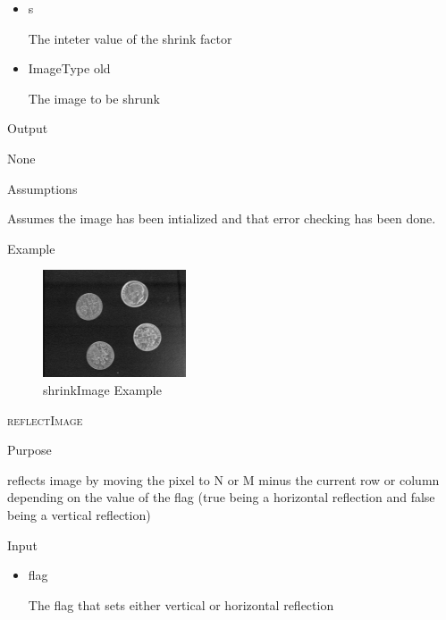 \documentclass[pdftex, 11pt]{article}
\begin{document}
\begin{description}
\begin{description}
				\begin{itemize}

					\item{s}

						The inteter value of the shrink factor

					\item{ImageType old}

						The image to be shrunk

				\end{itemize}

			\item{Output}

				None

			\item{Assumptions}

				Assumes the image has been intialized and that error
				checking has been done.

			\item{Example}

				\begin{figure}[h]
					\centering
					\caption{shrinkImage Example}
				\includegraphics{images/outshrink.png}
			\end{figure}

		\end{description}


	\item{\textsc{reflectImage}}
		\begin{description}
			\item{Purpose}

				reflects image by moving the pixel to N or M
				minus the current row or column
				depending on the value of the flag
				(true being a horizontal reflection and
				false being a vertical reflection)

			\item{Input}

				\begin{itemize}

					\item{flag}

						The flag that sets either vertical or
						horizontal reflection


\end{itemize}
\end{description}
\end{description}
\end{document}
